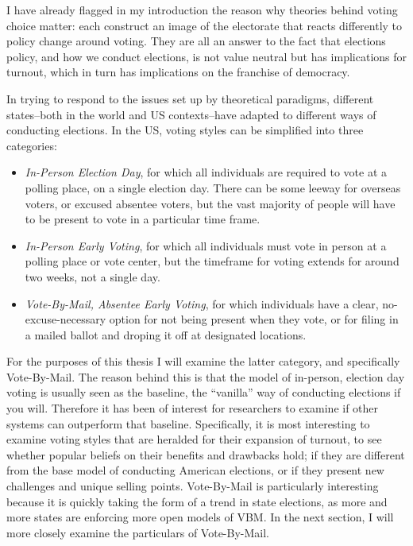 \documentclass[12pt,twoside]{reedthesis}
\begin{document}
  I have already flagged in my introduction the reason why theories behind
  voting choice matter: each construct an image of the electorate that
  reacts differently to policy change around voting. They are all an
  answer to the fact that elections policy, and how we conduct elections,
  is not value neutral but has implications for turnout, which in turn has
  implications on the franchise of democracy.
  
  In trying to respond to the issues set up by theoretical paradigms,
  different states--both in the world and US contexts--have adapted to
  different ways of conducting elections. In the US, voting styles can be
  simplified into three categories:
  
  \begin{itemize}
  \item
    \emph{In-Person Election Day}, for which all individuals are required
    to vote at a polling place, on a single election day. There can be
    some leeway for overseas voters, or excused absentee voters, but the
    vast majority of people will have to be present to vote in a
    particular time frame.
  \item
    \emph{In-Person Early Voting}, for which all individuals must vote in
    person at a polling place or vote center, but the timeframe for voting
    extends for around two weeks, not a single day.
  \item
    \emph{Vote-By-Mail, Absentee Early Voting}, for which individuals have
    a clear, no-excuse-necessary option for not being present when they
    vote, or for filing in a mailed ballot and droping it off at
    designated locations.
  \end{itemize}
  
  For the purposes of this thesis I will examine the latter category, and
  specifically Vote-By-Mail. The reason behind this is that the model of
  in-person, election day voting is usually seen as the baseline, the
  ``vanilla'' way of conducting elections if you will. Therefore it has
  been of interest for researchers to examine if other systems can
  outperform that baseline. Specifically, it is most interesting to
  examine voting styles that are heralded for their expansion of turnout,
  to see whether popular beliefs on their benefits and drawbacks hold; if
  they are different from the base model of conducting American elections,
  or if they present new challenges and unique selling points.
  Vote-By-Mail is particularly interesting because it is quickly taking
  the form of a trend in state elections, as more and more states are
  enforcing more open models of VBM. In the next section, I will more
  closely examine the particulars of Vote-By-Mail.
  
\end{document}
